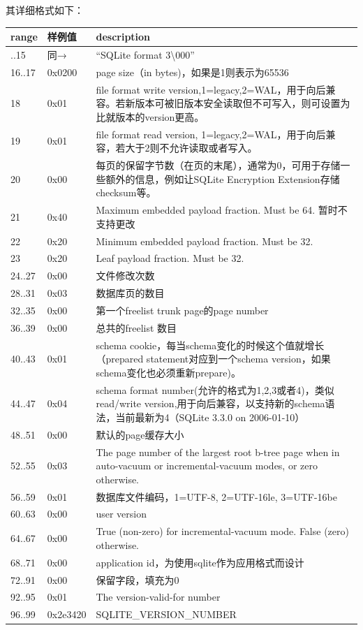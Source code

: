 \documentclass[12pt]{article}
\begin{document}
其详细格式如下：

{\def\LTcaptype{none} %
\begin{longtable}[]{@{}lll@{}}
\toprule\noalign{}
range & 样例值 & description \\
\midrule\noalign{}
\endhead
\bottomrule\noalign{}
\endlastfoot
00..15 & 同→ & ``SQLite format 3\textbackslash000'' \\
16..17 & 0x0200 & page size（in bytes)，如果是1则表示为65536 \\
18 & 0x01 & file format write version,1=legacy,2=WAL，用于向后兼容。若新版本可被旧版本安全读取但不可写入，则可设置为比就版本的version更高。 \\
19 & 0x01 & file format read version, 1=legacy,2=WAL，用于向后兼容，若大于2则不允许读取或者写入。 \\
20 & 0x00 & 每页的保留字节数（在页的末尾），通常为0，可用于存储一些额外的信息，例如让SQLite Encryption Extension存储checksum等。 \\
21 & 0x40 & Maximum embedded payload fraction. Must be 64. 暂时不支持更改 \\
22 & 0x20 & Minimum embedded payload fraction. Must be 32. \\
23 & 0x20 & Leaf payload fraction. Must be 32. \\
24..27 & 0x00 & 文件修改次数 \\
28..31 & 0x03 & 数据库页的数目 \\
32..35 & 0x00 & 第一个freelist trunk page的page number \\
36..39 & 0x00 & 总共的freelist 数目 \\
40..43 & 0x01 & schema cookie，每当schema变化的时候这个值就增长（prepared statement对应到一个schema version，如果schema变化也必须重新prepare)。 \\
44..47 & 0x04 & schema format number(允许的格式为1,2,3或者4)，类似read/write version,用于向后兼容，以支持新的schema语法，当前最新为4（SQLite 3.3.0 on 2006-01-10） \\
48..51 & 0x00 & 默认的page缓存大小 \\
52..55 & 0x03 & The page number of the largest root b-tree page when in auto-vacuum or incremental-vacuum modes, or zero otherwise. \\
56..59 & 0x01 & 数据库文件编码，1=UTF-8, 2=UTF-16le, 3=UTF-16be \\
60..63 & 0x00 & user version \\
64..67 & 0x00 & True (non-zero) for incremental-vacuum mode. False (zero) otherwise. \\
68..71 & 0x00 & application id，为使用sqlite作为应用格式而设计 \\
72..91 & 0x00 & 保留字段，填充为0 \\
92..95 & 0x01 & The version-valid-for number \\
96..99 & 0x2e3420 & SQLITE\_VERSION\_NUMBER \\
\end{longtable}
}
\end{document}

